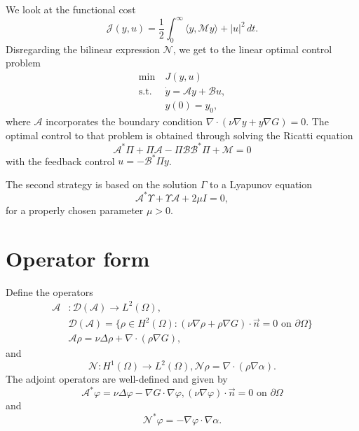 \documentclass[12pt]{article}
\newcommand{\N}{\mathcal{N}}
\newcommand{\A}{\mathcal{A}}
\newcommand{\B}{\mathcal{B}}
\newcommand{\n}{\vec{n}}
\theoremstyle{definition}
\begin{document}
We look at the functional cost
\[
\mathcal{J}(y, u) = \frac{1}{2}\int_0^{\infty} \langle y, \mathcal{M} y \rangle + |u|^2 \, dt.
\]
Disregarding the bilinear expression $\N$, we get to the linear optimal control problem
\begin{align*}
    \min~ &J(y,u) \\
    \text{s.t. } &\dot{y} = \A y + \B u, \\
    &y(0) = y_0,
\end{align*}
where $\A$ incorporates the boundary condition $\nabla \cdot (\nu \nabla y + y \nabla G) = 0$.
The optimal control to that problem is obtained through solving the Ricatti equation
\[
\mathcal{A}^*\Pi + \Pi\mathcal{A} - \Pi\mathcal{B}\mathcal{B}^*\Pi + \mathcal{M} = 0
\]
with the feedback control $u = -\mathcal{B}^{*}\Pi y$.

The second strategy is based on the solution $\Gamma$ to a Lyapunov equation
\[
\mathcal{A}^* \Upsilon + \Upsilon \mathcal{A} + 2 \mu I = 0,   
\]
for a properly chosen parameter $\mu > 0$.

\section{Operator form}

Define the operators 
\[
\begin{split}
    \mathcal{A} &: \mathcal{D}(\mathcal{A}) \to L^2(\Omega), \\
    &\mathcal{D}(\mathcal{A}) = \{\rho \in H^2(\Omega) : (\nu \nabla \rho + \rho \nabla G) \cdot \n = 0 \text{ on } \partial \Omega\} \\
    &\mathcal{A} \rho = \nu \Delta \rho + \nabla \cdot (\rho \nabla G),   
\end{split}
\]
and
\[
\mathcal{N} : H^1(\Omega) \to L^2(\Omega), \mathcal{N}\rho = \nabla \cdot (\rho \nabla \alpha).    
\]
The adjoint operators are well-defined and given by 
\[
\mathcal{A}^*\varphi = \nu \Delta \varphi - \nabla G \cdot \nabla \varphi, (\nu \nabla \varphi) \cdot \n = 0 \text{ on } \partial \Omega    
\]
and 
\[
\mathcal{N}^* \varphi = - \nabla \varphi \cdot  \nabla \alpha. 
\]
\end{document}
